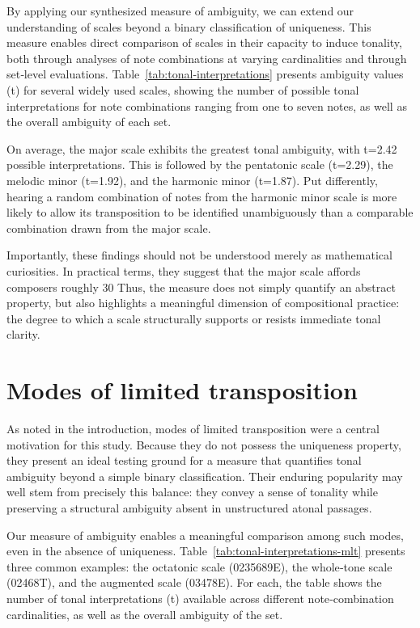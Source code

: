 \documentclass[10pt,twocolumn]{article}
\numberwithin{equation}{section} %
\begin{document}
    By applying our synthesized measure of ambiguity, we can extend our understanding of scales beyond a binary classification of uniqueness.
    This measure enables direct comparison of scales in their capacity to induce tonality, both through analyses of note combinations at varying cardinalities and through set‑level evaluations.
    Table~\ref{tab:tonal-interpretations} presents ambiguity values (t) for several widely used scales, showing the number of possible tonal interpretations for note combinations ranging from one to seven notes, as well as the overall ambiguity of each set.

    On average, the major scale exhibits the greatest tonal ambiguity, with t=2.42 possible interpretations.
    This is followed by the pentatonic scale (t=2.29), the melodic minor (t=1.92), and the harmonic minor (t=1.87).
    Put differently, hearing a random combination of notes from the harmonic minor scale is more likely to allow its transposition to be identified unambiguously than a comparable combination drawn from the major scale.

    Importantly, these findings should not be understood merely as mathematical curiosities.
    In practical terms, they suggest that the major scale affords composers roughly 30%
    Thus, the measure does not simply quantify an abstract property, but also highlights a meaningful dimension of compositional practice: the degree to which a scale structurally supports or resists immediate tonal clarity.

    

    \section{Modes of limited transposition}

    As noted in the introduction, modes of limited transposition were a central motivation for this study.
    Because they do not possess the uniqueness property, they present an ideal testing ground for a measure that quantifies tonal ambiguity beyond a simple binary classification.
    Their enduring popularity may well stem from precisely this balance: they convey a sense of tonality while preserving a structural ambiguity absent in unstructured atonal passages.

    Our measure of ambiguity enables a meaningful comparison among such modes, even in the absence of uniqueness.
    Table~\ref{tab:tonal-interpretations-mlt} presents three common examples: the octatonic scale (0235689E), the whole‑tone scale (02468T), and the augmented scale (03478E).
    For each, the table shows the number of tonal interpretations (t) available across different note‑combination cardinalities, as well as the overall ambiguity of the set.
\end{document}
